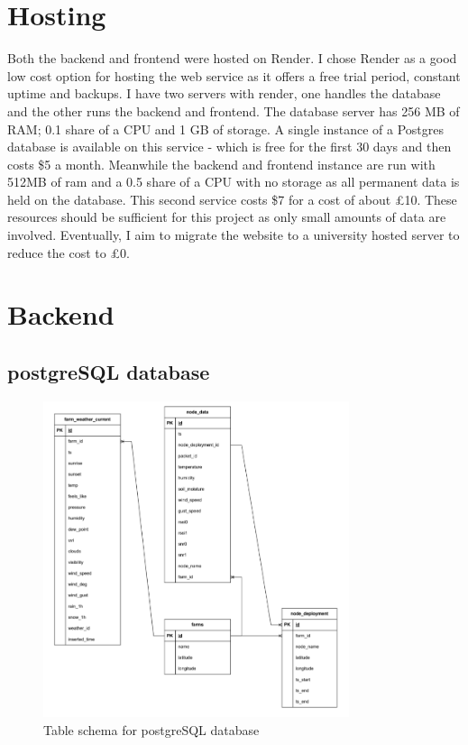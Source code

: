 \section{Hosting}

Both the backend and frontend were hosted on Render. I chose Render as a good
low cost option for hosting the web service as it offers a free trial period,
constant uptime and backups. I have two servers with render, one handles the
database and the other runs the backend and frontend. The database server has
256 MB of RAM; 0.1 share of a CPU and 1 GB of storage. A single instance of a
Postgres database is available on this service - which is free for the first 30
days and then costs \$5 a month. Meanwhile the backend and frontend instance are
run with 512MB of ram and a 0.5 share of a CPU with no storage as all permanent
data is held on the database. This second service costs \$7 for a cost of about
£10. These resources should be sufficient for this project as only small amounts
of data are involved. Eventually, I aim to migrate the website to a university
hosted server to reduce the cost to \pounds0.

\section{Backend}

\subsection{postgreSQL database}

\begin{figure}[H]
    \centering
    \includegraphics[width=0.8\textwidth]{contents/part-3/fig3/postgres_diagram.png}
    \caption{Table schema for postgreSQL database}
    \label{fig:db_schema}
\end{figure}

